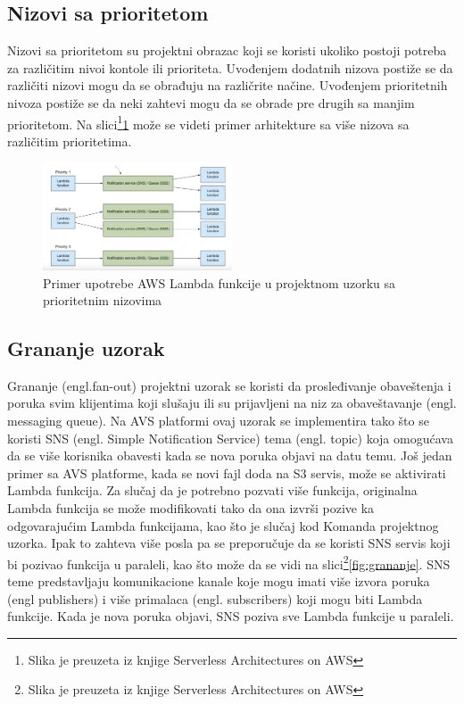 \documentclass[12pt,oneside]{memoir}
\begin{document}
\subsection{Nizovi sa prioritetom}
Nizovi sa prioritetom su projektni obrazac koji se koristi ukoliko postoji potreba za različitim nivoi kontole ili prioriteta. Uvođenjem dodatnih nizova postiže se da različiti nizovi mogu da se obrađuju na različrite načine. Uvođenjem prioritetnih nivoza postiže se da neki zahtevi mogu da se obrade pre drugih sa manjim prioritetom. Na slici\footnote{Slika je preuzeta iz knjige Serverless Architectures on AWS}\ref{fig:nizovi} može se videti primer arhitekture sa više nizova sa različitim prioritetima.

\begin{figure}[!ht]
  \centering
  \includegraphics[width=0.5\textwidth]{Slika 14.png}
  \caption{Primer upotrebe AWS Lambda funkcije u projektnom uzorku sa prioritetnim nizovima}
  \label{fig:nizovi}
\end{figure}
 
\subsection{Grananje uzorak} %
Grananje (engl.fan-out) projektni uzorak se koristi da prosleđivanje obaveštenja i poruka svim klijentima koji slušaju ili su prijavljeni na niz za obaveštavanje (engl. messaging queue). Na AVS platformi ovaj uzorak se implementira tako što se koristi SNS (engl. Simple Notification Service) tema (engl. topic) koja omogućava da se više korisnika obavesti kada se nova poruka objavi na datu temu. Još jedan primer sa AVS platforme, kada se novi fajl doda na S3 servis, može se aktivirati Lambda funkcija. Za slučaj da je potrebno pozvati više funkcija, originalna Lambda funkcija se može modifikovati tako da ona izvrši pozive ka odgovarajućim Lambda funkcijama, kao što je slučaj kod Komanda projektnog uzorka. Ipak to zahteva više posla pa se preporučuje da se koristi SNS servis koji bi pozivao funkcija u paraleli, kao što može da se vidi na slici\footnote{Slika je preuzeta iz knjige Serverless Architectures on AWS}\ref{fig:grananje}. SNS teme predstavljaju komunikacione kanale koje mogu imati više izvora poruka (engl publishers) i više primalaca (engl. subscribers) koji mogu biti Lambda funkcije. Kada je nova poruka objavi, SNS poziva sve Lambda funkcije u paraleli.
\end{document}
